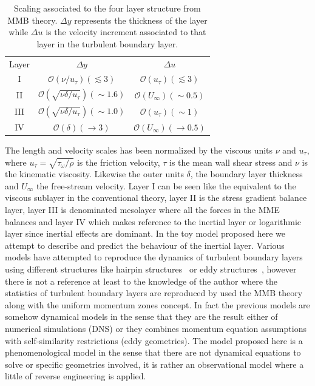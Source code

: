 \documentclass[aps,reprint,amsmath,amssymb,pra]{revtex4-1}%
\begin{document}
\begin{table}[htb]%
\caption{\label{tab:4layerstructure}%
Scaling associated to the four layer structure from MMB theory. $\Delta y$ represents the thickness of the layer while $\Delta u$ is the velocity increment associated to that layer in the turbulent boundary layer.
}
\begin{ruledtabular}
\begin{tabular}{ccc}
\textrm{Layer}&
\textrm{$\Delta y$}&
\textrm{$\Delta u$}\\
\colrule
I &$\mathcal{O}(\nu/u_{\tau})(\lesssim 3)$&$\mathcal{O}(u_{\tau})(\lesssim 3)$\\
II &$\mathcal{O}(\sqrt{\nu\delta/u_{\tau}})(\sim 1.6)$&$\mathcal{O}(U_{\infty})(\sim 0.5)$\\
III &$\mathcal{O}(\sqrt{\nu\delta/u_{\tau}})(\sim 1.0)$&$\mathcal{O}(u_{\tau})(\sim 1)$\\
IV &$\mathcal{O}(\delta)(\rightarrow 3)$&$\mathcal{O}(U_{\infty})(\rightarrow 0.5)$ \\
\end{tabular}
\end{ruledtabular}
\end{table}
The length and velocity scales has been normalized by the viscous units $\nu$ and $u_{\tau}$, where $u_{\tau}=\sqrt{\tau_{\omega}/\rho}$ is the friction velocity, $\tau$ is the mean wall shear stress and $\nu$ is the kinematic viscosity. Likewise the outer units $\delta$, the boundary layer thickness and $U_{\infty}$ the free-stream velocity. Layer I can be seen like the equivalent to the viscous sublayer in the conventional theory, layer II is the stress gradient balance layer, layer III  is denominated mesolayer where all the forces in the MME balances and layer IV which makes reference to the inertial layer or logarithmic layer since inertial effects are dominant. In the toy model proposed here we attempt to describe and predict the behaviour of the inertial layer. Various models have attempted to reproduce the dynamics of turbulent boundary layers using different structures like hairpin structures~\citep{adrian2007} or eddy structures~\citep{perry1995}, however there is not a reference at least to the knowledge of the author where the statistics of turbulent boundary layers are reproduced by used the MMB theory along with the uniform momentum zones concept. In fact the previous models are somehow dynamical models in the sense that they are the result either of numerical simulations (DNS) or they combines momentum equation assumptions with self-similarity restrictions (eddy geometries). The model proposed here is a phenomenological model in the sense that there are not dynamical equations to solve or specific geometries involved, it is rather an observational model where a little of reverse engineering is applied.\\
\end{document}
